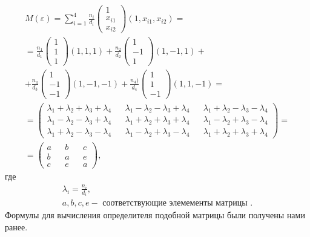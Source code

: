 \begin{multline*} 
M(\varepsilon) = \sum_{i = 1}^{4} \frac{n_i} {d_i} 
\begin{pmatrix}1 \\ x_{i1} \\ x_{i2} \end{pmatrix}
(1, x_{i1}, x_{i2}) = \\
= \frac {n_1} {d_1} \begin{pmatrix}1 \\ 1 \\ 1\end{pmatrix} (1, 1, 1) + 
\frac {n_2} {d_2} \begin{pmatrix}1 \\ -1 \\ 1\end{pmatrix} (1, -1, 1) + \\
+ \frac {n_3} {d_3} \begin{pmatrix}1 \\ -1 \\ -1\end{pmatrix} (1, -1, -1) +
\frac {n_4)} {d_4} \begin{pmatrix} 1 \\ 1 \\ -1\end{pmatrix} (1, 1, -1) = \\
= \begin{pmatrix}
\lambda_1 + \lambda_2 + \lambda_3 + \lambda_4 &&
\lambda_1 - \lambda_2 - \lambda_3 + \lambda_4 &&
\lambda_1 + \lambda_2 - \lambda_3 - \lambda_4
\\
\lambda_1 - \lambda_2 - \lambda_3 + \lambda_4 &&
\lambda_1 + \lambda_2 + \lambda_3 + \lambda_4 &&
\lambda_1 - \lambda_2 + \lambda_3 - \lambda_4
\\
\lambda_1 + \lambda_2 - \lambda_3 - \lambda_4 &&
\lambda_1 - \lambda_2 + \lambda_3 - \lambda_4 &&
\lambda_1 + \lambda_2 + \lambda_3 + \lambda_4
\end{pmatrix} = \\
= \begin{pmatrix}
a && b && c \\
b && a && e \\
c && e && a
\end{pmatrix},
\end{multline*}
где
\begin{gather*}
\lambda_i = \frac {n_i} {d_i}, \\
a, b, c, e - \text{ соответствующие элемементы матрицы }.
\end{gather*}
Формулы для вычисления определителя подобной матрицы были получены нами ранее.

